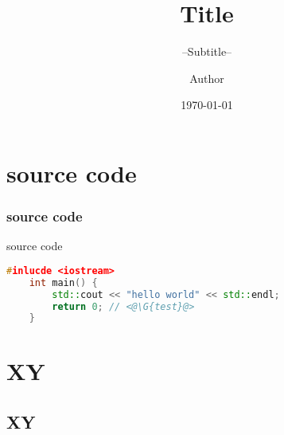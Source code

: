 \documentclass{beamer}
\title{
    Title
}
\subtitle{
    --Subtitle--
}
\author{Author}
\date{\today}
\newcommand{\G}[1]{\textcolor{lightgreen}{#1}}
\begin{document}
\frame{
    \titlepage
}


\section{source code}
\begin{frame}[fragile]
    \frametitle{source code}
    source code
    \begin{lstlisting}[language=c++]
    #inlucde <iostream>
    int main() {
        std::cout << "hello world" << std::endl;
        return 0; // <@\G{test}@>
    }
    \end{lstlisting}
\end{frame}

\section{XY}

\subsection{XY}
\end{document}
